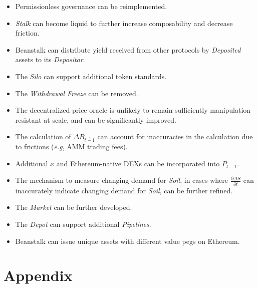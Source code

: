 \documentclass[tikz]{article}
\newcommand{\term}[1]{\textsl{#1}}
\begin{document}
\newpage
\begin{itemize}
    \item Permissionless governance can be reimplemented.
    \item \term{Stalk} can become liquid to further increase composability and decrease friction. 
    \item Beanstalk can distribute yield received from other protocols by \term{Deposited} assets to its \term{Depositor}.
    \item The \term{Silo} can support additional token standards.
    \item The \term{Withdrawal} \term{Freeze} can be removed.
    \item The decentralized price oracle is unlikely to remain sufficiently manipulation resistant at scale, and can be significantly improved. 
    \item The calculation of $\Delta B_{\overline{t-1}}$ can account for inaccuracies in the calculation due to frictions (\term{e.g}, AMM trading fees).
    \item Additional $x$ and Ethereum-native DEXs can be incorporated into $P_{\overline{t-1}}$.
    \item The mechanism to measure changing demand for \term{Soil}, in cases where $\frac{\partial \Delta S}{\partial t}$ can inaccurately indicate changing demand for \term{Soil}, can be further refined.
    \item The \term{Market} can be further developed.
    \item The \term{Depot} can support additional \term{Pipelines}.
    \item Beanstalk can issue unique assets with different value pegs on Ethereum.
\end{itemize}

\newpage
\section{Appendix}

\newpage

\newpage

\newpage

\newpage

\newpage

\newpage

\newpage

\newpage

\newpage

\newpage

\newpage
\end{document}
